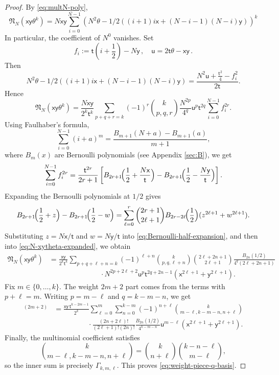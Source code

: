 \documentclass[11pt]{article}
\theoremstyle{definition}
\begin{document}
\begin{proof}
By \eqref{eq:multN-poly},
\[
 \mathfrak N_N(\mathsf{x}\mathsf{y}\theta^k)=N\mathsf{x}\mathsf{y}\sum_{i=0}^{N-1}(N^2\theta-1/2((i+1)i\mathsf{x}+(N-i-1)(N-i)\mathsf{y}))^k
\]
In particular, the coefficient of $N^0$ vanishes. Set
$$
f_i:=\mathsf{t}\left(i+\frac12\right)-N\mathsf{y}\, ,\quad \mathsf{u} = 2\mathsf{t}\theta-\mathsf{x}\mathsf{y}\, .
$$
Then
\[
N^2\theta-1/2((i+1)i\mathsf{x}+(N-i-1)(N-i)\mathsf{y})=\frac{N^2\mathsf{u}+\frac{\mathsf{t}^2}{4}-f_i^2}{2\mathsf{t}}.
\]
Hence
\begin{equation}\label{eq:N-xytheta-expanded}
 \mathfrak N_N(\mathsf{x}\mathsf{y}\theta^k)
 =
 \frac{N\mathsf{x}\mathsf{y}}{2^k\mathsf{t}^k}
 \sum_{p+q+r=k}
 (-1)^r\binom{k}{p,q,r}
 \frac{N^{2p}}{4^q}\mathsf{u}^p\mathsf{t}^{2q}
 \sum_{i=0}^{N-1}f_i^{2r}.
\end{equation}
Using Faulhaber's formula,
$$
\sum_{i=0}^{N-1}(i+a)^m = \frac{B_{m+1}(N+a)-B_{m+1}(a)}{m+1},
$$
where $B_m(x)$ are Bernoulli polynomials (see Appendix \ref{sec:B}), we get
\[
\sum_{i=0}^{N-1}f_i^{2r}=\frac{\mathsf{t}^{2r}}{2r+1}
\left[B_{2r+1}\!\Bigl(\frac12+\frac{N\mathsf{x}}{\mathsf{t}}\Bigr)-B_{2r+1}\!\Bigl(\frac12-\frac{N\mathsf{y}}{\mathsf{t}}\Bigr)\right].
\]
Expanding the Bernoulli polynomials at $1/2$ gives
\begin{equation}\label{eq:Bernoulli-half-expansion}
 B_{2r+1}\!\Bigl(\frac12+z\Bigr)-B_{2r+1}\!\Bigl(\frac12-w\Bigr)
 =
 \sum_{\ell=0}^r
 \binom{2r+1}{2\ell+1}
 B_{2r-2\ell}\!\Bigl(\frac12\Bigr)
 (z^{2\ell+1}+w^{2\ell+1}).
\end{equation}
Substituting $z= N\mathsf{x}/\mathsf{t}$ and $w=N\mathsf{y}/\mathsf{t}$ into \eqref{eq:Bernoulli-half-expansion}, and then into \eqref{eq:N-xytheta-expanded}, we obtain
\begin{align*}
\mathfrak N_N(\mathsf{x}\mathsf{y}\theta^k)
&=
\frac{\mathsf{x}\mathsf{y}}{2^k\mathsf{t}^k}
\sum_{p+q+\ell+n=k}
(-1)^{\ell+n}\binom{k}{p,q,\ell+n}
\binom{2\ell+2n+1}{2\ell+1}
\frac{B_{2n}(1/2)}{4^q(2\ell+2n+1)}\\
&\hspace{3cm}\cdot N^{2p+2\ell+2}\mathsf{u}^p\mathsf{t}^{2q+2n-1}(\mathsf{x}^{2\ell+1}+\mathsf{y}^{2\ell+1}).
\end{align*}
Fix $m\in\{0,\dots,k\}$. The weight $2m+2$ part comes from the terms with $p+\ell=m$. Writing $p=m-\ell$ and $q=k-m-n$, we get
\begin{align*}
[\mathsf{x}\mathsf{y}\theta^k]^{(2m+2)}&=\frac{\mathsf{x}\mathsf{y}\,\mathsf{t}^{k-2m-1}}{2^k}\sum_{\ell=0}^{m}\sum_{n=0}^{k-m}(-1)^{n+\ell}\binom{k}{m-\ell,k-m-n,n+\ell}\\
&\hspace{2cm}\cdot\frac{(2n+2\ell)!}{(2\ell+1)!(2n)!}\frac{B_{2n}(1/2)}{4^{k-m-n}}\mathsf{u}^{m-\ell}(\mathsf{x}^{2\ell+1}+\mathsf{y}^{2\ell+1}).
\end{align*}
Finally, the multinomial coefficient satisfies
\[
\binom{k}{m-\ell,k-m-n,n+\ell}
=
\binom{k}{n+\ell}\binom{k-n-\ell}{m-\ell},
\]
so the inner sum is precisely $\Gamma_{k,m,\ell}$. This proves \eqref{eq:weight-piece-q-basis}.
\end{proof}
\end{document}
